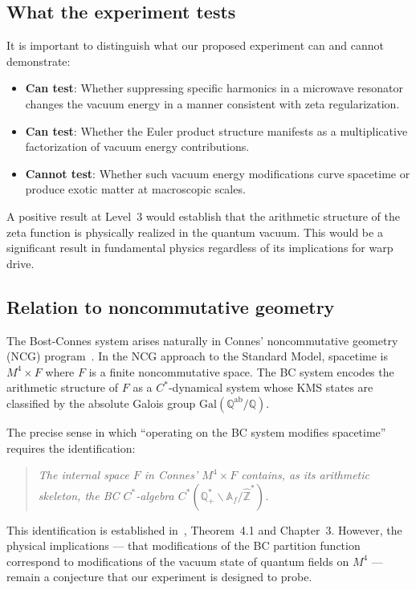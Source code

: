 \documentclass[aps,prd,twocolumn,superscriptaddress,nofootinbib]{revtex4-2}
\newcommand{\Gal}{\mathrm{Gal}}
\newcommand{\Zhat}{\hat{\mathbb{Z}}}
\begin{document}
\subsection{What the experiment tests}

It is important to distinguish what our proposed experiment can
and cannot demonstrate:
\begin{itemize}
  \item \textbf{Can test}: Whether suppressing specific harmonics
    in a microwave resonator changes the vacuum energy in a manner
    consistent with zeta regularization.
  \item \textbf{Can test}: Whether the Euler product structure
    manifests as a multiplicative factorization of vacuum
    energy contributions.
  \item \textbf{Cannot test}: Whether such vacuum energy modifications
    curve spacetime or produce exotic matter at macroscopic scales.
\end{itemize}

A positive result at Level~3 would establish that the arithmetic
structure of the zeta function is physically realized in the
quantum vacuum. This would be a significant result in fundamental
physics regardless of its implications for warp drive.

\subsection{Relation to noncommutative geometry}

The Bost-Connes system arises naturally in Connes' noncommutative
geometry (NCG) program~\cite{Connes1994,ConnesMarcolli2006}.
In the NCG approach to the Standard Model, spacetime is
$M^4 \times F$ where $F$ is a finite noncommutative space.
The BC system encodes the arithmetic structure of $F$ as a
$C^*$-dynamical system whose KMS states are classified by the
absolute Galois group $\Gal(\mathbb{Q}^{\mathrm{ab}}/\mathbb{Q})$.

The precise sense in which ``operating on the BC system
modifies spacetime'' requires the identification:
\begin{quotation}
\noindent \emph{The internal space $F$ in Connes' $M^4 \times F$
contains, as its arithmetic skeleton, the BC $C^*$-algebra
$C^*(\mathbb{Q}^*_+ \backslash \mathbb{A}_f / \Zhat^*)$.}
\end{quotation}
This identification is established in~\cite{ConnesMarcolli2006},
Theorem~4.1 and Chapter~3. However, the physical
implications --- that modifications of the BC partition function
correspond to modifications of the vacuum state of quantum fields
on $M^4$ --- remain a conjecture that our experiment is designed to probe.
\end{document}
